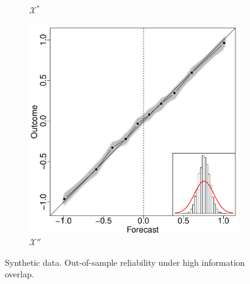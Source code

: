 \documentclass[11pt]{article}
\theoremstyle{definition}
\theoremstyle{definition}
\begin{document}
\begin{figure}[t!]
\begin{subfigure}[b]{0.241\textwidth}
                \caption{$\mathcal{X}^*$ }
        \label{ELOPHighOverlap}
        \end{subfigure}
           \begin{subfigure}[b]{0.241\textwidth}
                \includegraphics[width=\textwidth]{SimDepOPT.pdf}
                \caption{$\mathcal{X}''$ }
        \label{RevHighOverlap}
        \end{subfigure}
          \caption{Synthetic data. Out-of-sample reliability under high information overlap. }
   \label{HighOverlap}
\end{figure}
\end{document}

